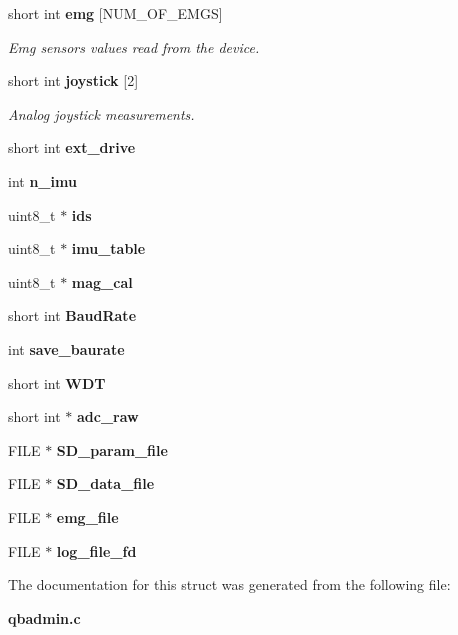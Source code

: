 \begin{DoxyCompactItemize}
\mbox{\label{structglobal__args_ac99613e9febb46b081ae696a20e34c62}} 
short int \textbf{ emg} [N\+U\+M\+\_\+\+O\+F\+\_\+\+E\+M\+GS]
\begin{DoxyCompactList}\small\item\em Emg sensors values read from the device. \end{DoxyCompactList}\item 
\mbox{\label{structglobal__args_a0cace64ae2459f06bc0bda1979b0c06f}} 
short int \textbf{ joystick} [2]
\begin{DoxyCompactList}\small\item\em Analog joystick measurements. \end{DoxyCompactList}\item 
\mbox{\label{structglobal__args_af848f8d2dca8dfbccc182293c8ba25bf}} 
short int {\bfseries ext\+\_\+drive}
\item 
\mbox{\label{structglobal__args_ae50c6d44444a5d147ccf31081e10bc85}} 
int {\bfseries n\+\_\+imu}
\item 
\mbox{\label{structglobal__args_ae3def1b858fcea933e43d272cc37b712}} 
uint8\+\_\+t $\ast$ {\bfseries ids}
\item 
\mbox{\label{structglobal__args_a3c9b4fd20398502b26a9f5d6e520b580}} 
uint8\+\_\+t $\ast$ {\bfseries imu\+\_\+table}
\item 
\mbox{\label{structglobal__args_a1bc693ca600ac57486bf05378ed1ccd8}} 
uint8\+\_\+t $\ast$ {\bfseries mag\+\_\+cal}
\item 
\mbox{\label{structglobal__args_a8f68c2db71004b2beac47c7ce6feb94c}} 
short int {\bfseries Baud\+Rate}
\item 
\mbox{\label{structglobal__args_a15a8bc4e37e5294ee939c1dd620095a8}} 
int {\bfseries save\+\_\+baurate}
\item 
\mbox{\label{structglobal__args_abd2a5fb7d2e58a98c4394067565b5492}} 
short int {\bfseries W\+DT}
\item 
\mbox{\label{structglobal__args_a42727c6cdc43ea724e43e8c905defc4e}} 
short int $\ast$ {\bfseries adc\+\_\+raw}
\item 
\mbox{\label{structglobal__args_a77465fe4493fad8152b0516e496ca472}} 
F\+I\+LE $\ast$ {\bfseries S\+D\+\_\+param\+\_\+file}
\item 
\mbox{\label{structglobal__args_a24c393283c73c2307fefcb2107e64761}} 
F\+I\+LE $\ast$ {\bfseries S\+D\+\_\+data\+\_\+file}
\item 
\mbox{\label{structglobal__args_ac3ca959d3b7ae254f86531e0b82affcb}} 
F\+I\+LE $\ast$ {\bfseries emg\+\_\+file}
\item 
\mbox{\label{structglobal__args_a5fbba9db8f8d479d7607ec6e8617026a}} 
F\+I\+LE $\ast$ {\bfseries log\+\_\+file\+\_\+fd}
\end{DoxyCompactItemize}


The documentation for this struct was generated from the following file\+:\begin{DoxyCompactItemize}
\item 
\textbf{ qbadmin.\+c}\end{DoxyCompactItemize}
